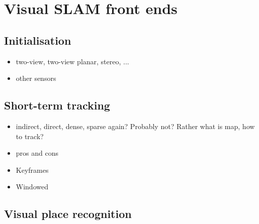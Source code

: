 \chapter{Visual SLAM front ends}

\section{Initialisation}
\begin{itemize}
    \item two-view, two-view planar, stereo, ...
    \item other sensors
\end{itemize}

\section{Short-term tracking}

\begin{itemize}
    \item indirect, direct, dense, sparse again? Probably not? Rather what is map, how to track?
    \item pros and cons
    \item Keyframes
    \item Windowed
\end{itemize}

\section{Visual place recognition}

